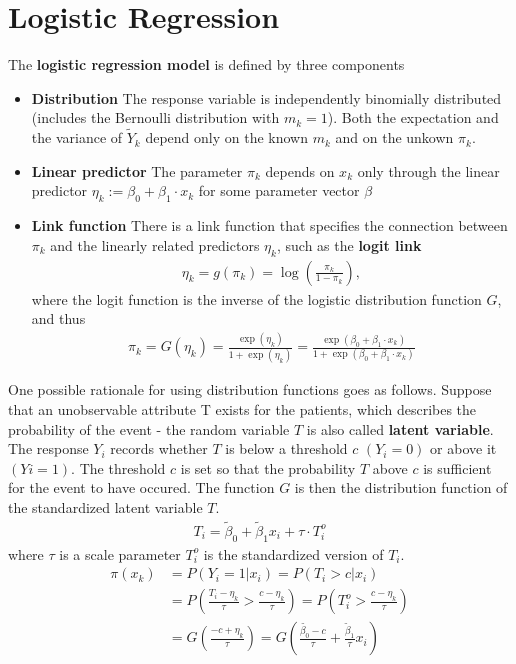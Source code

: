 \section{Logistic Regression}
The \textbf{logistic regression model} is defined by three components
\begin{itemize}
\item \textbf{Distribution} The response variable is
independently binomially distributed
(includes the Bernoulli distribution with $m_k = 1$).
Both the expectation and the variance of $\widetilde{Y}_k$ depend only on
the known $m_k$ and on the unkown $\pi_k$.
\item \textbf{Linear predictor} The parameter $\pi_k$ depends on $x_k$ only
through the linear predictor $\eta_k := \beta_0 + \beta_1 \cdot x_k$ for some
parameter vector $\beta$
\item \textbf{Link function} There is a link function
that specifies the connection between $\pi_k$ and
the linearly related predictors $\eta_k$,
such as the \textbf{logit link}
\begin{align*}
\eta_k
=
g(\pi_k)
=
\log\left(\frac{\pi_k}{1-\pi_k}\right),
\end{align*}
where the logit function is the inverse
of the logistic distribution function $G$,
and thus
\begin{align*}
\pi_k
=
G(\eta_k)
=
\frac{\exp(\eta_k)}{1+\exp(\eta_k)}
=
\frac{\exp(\beta_0 + \beta_1 \cdot x_k)}{1+\exp(\beta_0 + \beta_1 \cdot x_k)}
\end{align*}
\end{itemize}
One possible rationale for using distribution functions goes as follows.
Suppose that an unobservable attribute T exists for the patients,
which describes the probability of the event -
the random variable $T$ is also called \textbf{latent variable}.
The response $Y_i$ records whether $T$ is below a threshold $c$ $(Y_i = 0)$
or above it $(Y i = 1)$.
The threshold $c$ is set so that the probability $T$ above $c$ is sufficient
for the event to have occured.
The function $G$ is then the distribution function
of the standardized latent variable $T$.
\begin{align*}
T_i
=
\widetilde{\beta}_0 + \widetilde{\beta}_1 x_i + \tau \cdot T_i^o
\end{align*}
where $\tau$ is a scale parameter $T_i^o$ is the standardized version of $T_i$.
\begin{align*}
\pi(x_k)
 & =
P(Y_i = 1 | x_i)
= P(T_i > c | x_i)
\\
 & =
P\left( \frac{T_i - \eta_k}{\tau} > \frac{c-\eta_k}{\tau}\right)
=
P\left( T_i^o > \frac{c-\eta_k}{\tau} \right)
\\
 & =
G\left( \frac{-c + \eta_k}{\tau} \right)
=
G\left( \frac{\widetilde{\beta_0} - c}{\tau} +
\frac{\widetilde{\beta}_1}{\tau} x_i \right)
\end{align*}

